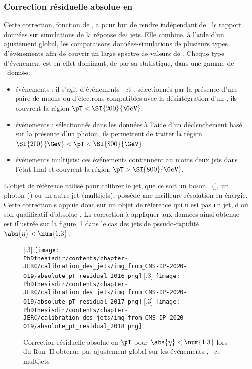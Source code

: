 \subsubsection{Correction résiduelle absolue en \pT}\label{chapter-JERC-section-CMS-subsec-residuals_pT}
Cette correction, fonction de \pT, a pour but de rendre indépendant de \pT\ le rapport données sur simulations de la réponse des jets.
Elle combine, à l'aide d'un ajustement global, les comparaisons données-simulations de plusieurs types d'événements afin de couvrir un large spectre de valeurs de \pT. Chaque type d'événement est en effet dominant, de par sa statistique, dans une gamme de \pT\ donnée:
\begin{itemize}
\item événements \Zjet: il s'agit d'événements \Zmmjet\ et \Zeejet, sélectionnés par la présence d'une paire de muons ou d'électrons compatibles avec la désintégration d'un \Zboson, ils couvrent la région $\pT<\SI{200}{\GeV}$;
\item événements \Gjet: sélectionnés dans les données à l'aide d'un déclenchement basé sur la présence d'un photon, ils permettent de traiter la région $\SI{200}{\GeV}<\pT<\SI{800}{\GeV}$;
\item événements multijets: ces événements contiennent au moins deux jets dans l'état final et couvrent la région $\pT>\SI{800}{\GeV}$.
\end{itemize}
\par L'objet de référence utilisé pour calibrer le jet, que ce soit un boson \Zboson\ (\Zjet), un photon (\Gjet) ou un autre jet (multijets), possède une meilleure résolution en énergie.
Cette correction s'appuie donc sur un objet de référence qui n'est pas un jet, d'où son qualificatif d'\og absolue \fg.
La correction à appliquer aux données ainsi obtenue est illustrée sur la figure~\ref{fig-L2ResAbs_RunII} dans le cas des jets de pseudo-rapidité $\abs{\eta}<\num{1.3}$.
\begin{figure}[h]
\centering
{}[.3\textwidth]
{\texttt{[image: \\PhDthesisdir/contents/chapter-JERC/calibration\_des\_jets/img\_from\_CMS-DP-2020-019/absolute\_pT\_residual\_2016.png]}}
\hfill
{}[.3\textwidth]
{\texttt{[image: \\PhDthesisdir/contents/chapter-JERC/calibration\_des\_jets/img\_from\_CMS-DP-2020-019/absolute\_pT\_residual\_2017.png]}}
\hfill
{}[.3\textwidth]
{\texttt{[image: \\PhDthesisdir/contents/chapter-JERC/calibration\_des\_jets/img\_from\_CMS-DP-2020-019/absolute\_pT\_residual\_2018.png]}}
\caption[Correction résiduelle absolue en $\pT$ pour $\abs{\eta}<\num{1.3}$ lors du Run~II.]{Correction résiduelle absolue en $\pT$ pour $\abs{\eta}<\num{1.3}$ lors du Run~II obtenue par ajustement global sur les événements \Gjet, \Zjet\ et multijets~\cite{CMS-DP-2020-019}.}
\label{fig-L2ResAbs_RunII}
\end{figure}
